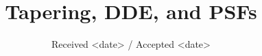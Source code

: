 \documentclass[]{aa}
\begin{document}
      
	      
\title{Tapering, DDE, and PSFs}

\subtitle{}
\author{}%

\date{Received <date> / Accepted <date>}


\abstract{
}




   \maketitle











\end{document}
